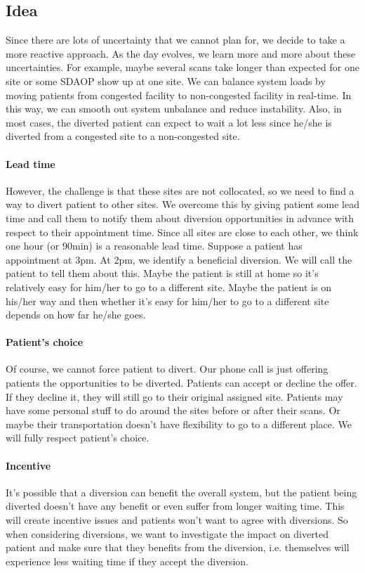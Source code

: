 \subsection{Idea}

Since there are lots of uncertainty that we cannot plan for, we decide to take a more reactive approach. As the day evolves, we learn more and more about these uncertainties. For example, maybe several scans take longer than expected for one site or some SDAOP show up at one site. We can balance system loads by moving patients from congested facility to non-congested facility in real-time. In this way, we can smooth out system unbalance and reduce instability. Also, in most cases, the diverted patient can expect to wait a lot less since he/she is diverted from a congested site to a non-congested site.

\paragraph{Lead time} However, the challenge is that these sites are not collocated, so we need to find a way to divert patient to other sites. We overcome this by giving patient some lead time and call them to notify them about diversion opportunities in advance with respect to their appointment time. Since all sites are close to each other, we think one hour (or 90min) is a reasonable lead time. Suppose a patient has appointment at 3pm. At 2pm, we identify a beneficial diversion. We will call the patient to tell them about this. Maybe the patient is still at home so it's relatively easy for him/her to go to a different site. Maybe the patient is on his/her way and then whether it's easy for him/her to go to a different site depends on how far he/she goes.

\paragraph{Patient's choice} Of course, we cannot force patient to divert. Our phone call is just offering patients the opportunities to be diverted. Patients can accept or decline the offer. If they decline it, they will still go to their original assigned site. Patients may have some personal stuff to do around the sites before or after their scans. Or maybe their transportation doesn't have flexibility to go to a different place. We will fully respect patient's choice.

\paragraph{Incentive} It's possible that a diversion can benefit the overall system, but the patient being diverted doesn't have any benefit or even suffer from longer waiting time. This will create incentive issues and patients won't want to agree with diversions. So when considering diversions, we want to investigate the impact on diverted patient and make sure that they benefits from the diversion, i.e. themselves will experience less waiting time if they accept the diversion.

